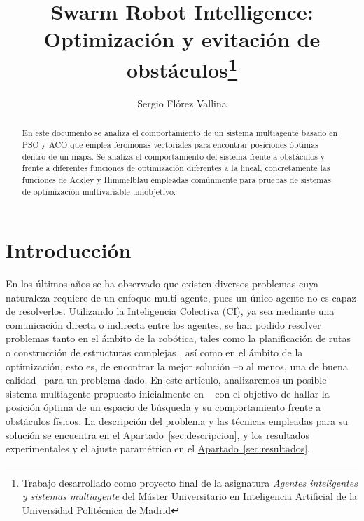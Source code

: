 \documentclass[runningheads]{llncs}
\newcommand{\refcruzada}[2]{\hyperref[#2]{#1~\ref{#2}}}
\begin{document}
    \title{Swarm Robot Intelligence: Optimización y evitación de obstáculos\thanks{Trabajo desarrollado como proyecto final de la asignatura \textit{Agentes inteligentes y sistemas multiagente} del Máster Universitario en Inteligencia Artificial de la Universidad Politécnica de Madrid}}
    \author{Sergio Flórez Vallina}

    \maketitle              %
    \begin{abstract}
        En este documento se analiza el comportamiento de un sistema multiagente basado en PSO y ACO
        que emplea feromonas vectoriales para encontrar posiciones óptimas dentro de un mapa. 
        Se analiza el comportamiento del sistema frente a obstáculos y frente a diferentes funciones
        de optimización diferentes a la lineal, concretamente las funciones de Ackley y Himmelblau
        empleadas comúnmente para pruebas de sistemas de optimización multivariable uniobjetivo.

    \end{abstract}

    \section{Introducción}
    En los últimos años se ha observado que existen diversos problemas cuya naturaleza requiere de un enfoque multi-agente, pues un único agente no es capaz de resolverlos.
    Utilizando la Inteligencia Colectiva (CI), ya sea mediante una comunicación directa o indirecta entre los agentes, se han podido resolver problemas tanto en el ámbito de la robótica, tales como la planificación de rutas o construcción de estructuras complejas \cite{collectiveConstruction}, así como en el ámbito de la optimización, esto es, de encontrar la mejor solución --o al menos, una de buena calidad-- para un problema dado.
    En este artículo, analizaremos un posible sistema multiagente propuesto inicialmente en ~\cite{initialPaper}  con el objetivo de hallar la posición óptima de un espacio de búsqueda y su comportamiento frente a obstáculos físicos.
    La descripción del problema y las técnicas empleadas para su solución se encuentra en el \refcruzada{Apartado}{sec:descripcion}, y los resultados experimentales y el ajuste paramétrico en el \refcruzada{Apartado}{sec:resultados}. %
    
\end{document}

